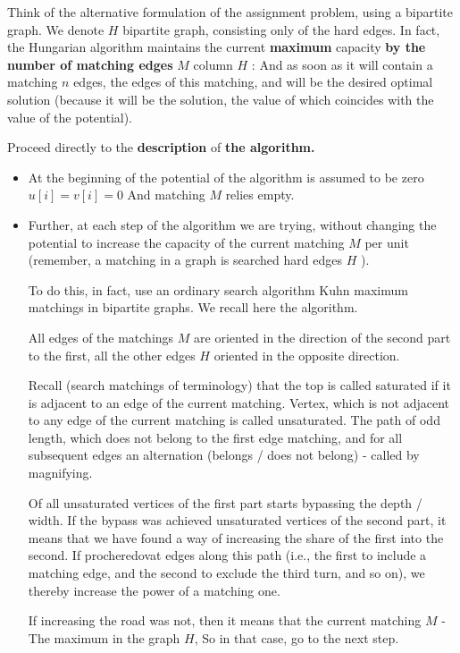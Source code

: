 Think of the alternative formulation of the assignment problem, using a bipartite graph. We denote $H$ bipartite graph, consisting only of the hard edges. In fact, the Hungarian algorithm maintains the current \textbf{maximum} capacity \textbf{by the number of matching edges} \textbf{$M$} column $H$ : And as soon as it will contain a matching $n$ edges, the edges of this matching, and will be the desired optimal solution (because it will be the solution, the value of which coincides with the value of the potential).

Proceed directly to the \textbf{description} of \textbf{the algorithm.}

\begin{itemize}

\item At the beginning of the potential of the algorithm is assumed to be zero $u [i] = v [i] = 0$ And matching $M$ relies empty.

\item Further, at each step of the algorithm we are trying, without changing the potential to increase the capacity of the current matching $M$ per unit (remember, a matching in a graph is searched hard edges $H$ ).

To do this, in fact, use an ordinary search algorithm Kuhn maximum matchings in bipartite graphs. We recall here the algorithm.

All edges of the matchings $M$ are oriented in the direction of the second part to the first, all the other edges $H$ oriented in the opposite direction.

Recall (search matchings of terminology) that the top is called saturated if it is adjacent to an edge of the current matching. Vertex, which is not adjacent to any edge of the current matching is called unsaturated. The path of odd length, which does not belong to the first edge matching, and for all subsequent edges an alternation (belongs / does not belong) - called by magnifying.

Of all unsaturated vertices of the first part starts bypassing the depth / width. If the bypass was achieved unsaturated vertices of the second part, it means that we have found a way of increasing the share of the first into the second. If procheredovat edges along this path (i.e., the first to include a matching edge, and the second to exclude the third turn, and so on), we thereby increase the power of a matching one.

If increasing the road was not, then it means that the current matching $M$ - The maximum in the graph $H$, So in that case, go to the next step.


\end{itemize}
